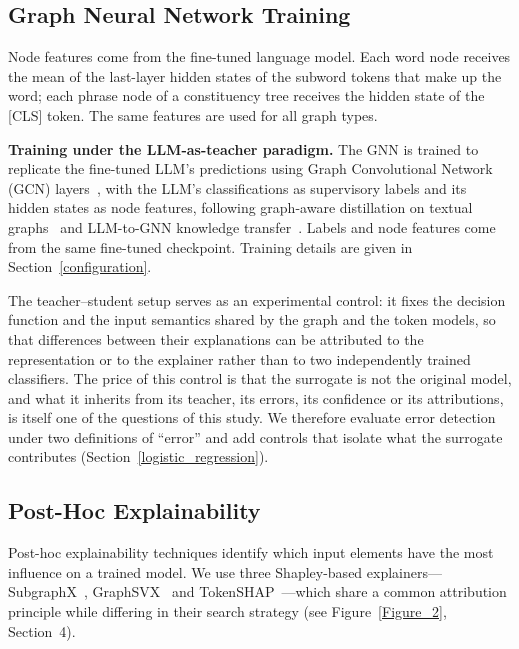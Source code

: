 \documentclass[preprint, times, review, 10pt]{elsarticle}
\begin{document}
\subsection{Graph Neural Network Training} \label{gnn}

Node features come from the fine-tuned language model. Each word node receives the mean of the last-layer hidden states of the subword tokens that make up the word; each phrase node of a constituency tree receives the hidden state of the [CLS] token. The same features are used for all graph types.

\textbf{Training under the LLM-as-teacher paradigm.} The GNN is trained to replicate the fine-tuned LLM's predictions using Graph Convolutional Network (GCN) layers~\cite{kipf2017semisupervisedclassificationgraphconvolutional}, with the LLM's classifications as supervisory labels and its hidden states as node features, following graph-aware distillation on textual graphs~\cite{mavromatis2023traingnnteachergraphaware} and LLM-to-GNN knowledge transfer~\cite{li2024enhancinggraphneuralnetworks,hu2024largelanguagemodelmeets}. Labels and node features come from the same fine-tuned checkpoint. Training details are given in Section~\ref{configuration}.

The teacher--student setup serves as an experimental control: it fixes the decision function and the input semantics shared by the graph and the token models, so that differences between their explanations can be attributed to the representation or to the explainer rather than to two independently trained classifiers. The price of this control is that the surrogate is not the original model, and what it inherits from its teacher, its errors, its confidence or its attributions, is itself one of the questions of this study. We therefore evaluate error detection under two definitions of ``error'' and add controls that isolate what the surrogate contributes (Section~\ref{logistic_regression}).

\subsection{Post-Hoc Explainability}
\label{explainability}

Post-hoc explainability techniques identify which input elements have the most influence on a trained model. We use three Shapley-based explainers---SubgraphX~\cite{yuan2021explainabilitygraphneuralnetworks}, GraphSVX~\cite{duval2021graphsvxshapleyvalueexplanations} and TokenSHAP~\cite{goldshmidt2024tokenshapinterpretinglargelanguage}---which share a common attribution principle while differing in their search strategy (see Figure~\ref{Figure_2}, Section~4).
\end{document}
